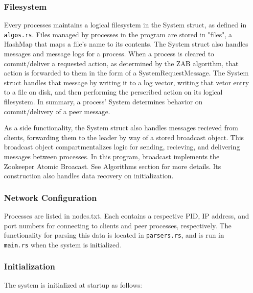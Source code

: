 \documentclass{article}
\begin{document}
    \subsubsection*{Filesystem}
        Every processes maintains a logical filesystem in the System struct, as defined in \verb|algos.rs|. Files managed by processes in the program are stored in "files", a HashMap that maps a file's name to its contents. The System struct also handles messages and message logs for a process. When a process is cleared to commit/deliver a requested action, as determined by the ZAB algorithm, that action is forwarded to them in the form of a SystemRequestMessage. The System struct handles that message by writing it to a log vector, writing that vetor entry to a file on disk, and then performing the perscribed action on its logical filesystem. In summary, a process' System determines behavior on commit/delivery of a peer message.

        As a side functionality, the System struct also handles messages recieved from clients, forwarding them to the leader by way of a stored broadcast object. This broadcast object compartmentalizes logic for sending, recieving, and delivering messages between processes. In this program, broadcast implements the Zookeeper Atomic Broacast. See Algorithms section for more details. Its construction also handles data recovery on initialization.

    \subsubsection*{Network Configuration}
        Processes are listed in nodes.txt. Each contains a respective PID, IP address, and port numbers for connecting to clients and peer processes, respectively. The functionality for parsing this data is located in \verb|parsers.rs|, and is run in \verb|main.rs| when the system is initialized.

    \subsubsection*{Initialization}
        The system is initialized at startup as follows:
\end{document}
